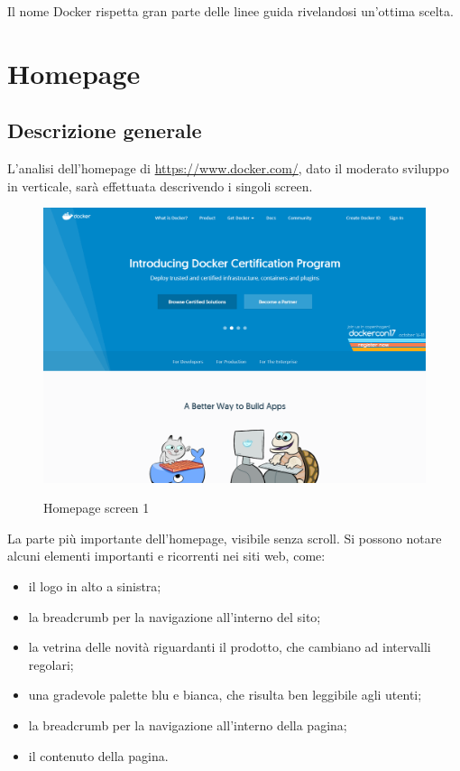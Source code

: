 \documentclass[a4paper]{article}
\begin{document}
Il nome Docker rispetta gran parte delle linee guida rivelandosi un'ottima scelta.

\section{Homepage}

\subsection{Descrizione generale}
L'analisi dell'homepage di \url{https://www.docker.com/}, dato il moderato sviluppo in verticale, sarà effettuata descrivendo i singoli screen.

\begin{figure}[H]
	\centering
	\includegraphics[width=\linewidth]{images/homepage1.png}
    \label{fig:homepage1}
    \caption{Homepage screen 1}
\end{figure}

\noindent La parte più importante dell'homepage, visibile senza scroll. Si possono notare alcuni elementi importanti e ricorrenti nei siti web, come:

\begin{itemize}
	\item il logo in alto a sinistra;
    \item la breadcrumb per la navigazione all'interno del sito;
    \item la vetrina delle novità riguardanti il prodotto, che cambiano ad intervalli regolari;
    \item una gradevole palette blu e bianca, che risulta ben leggibile agli utenti;
    \item la breadcrumb per la navigazione all'interno della pagina;
    \item il contenuto della pagina.
\end{itemize}
\end{document}
